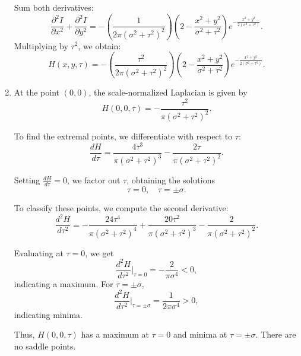 \documentclass[12pt]{article}
\begin{document}
\begin{enumerate}[label=\roman*., leftmargin=1cm]
Sum both derivatives:
\begin{equation}
    \frac{\partial^2 I}{\partial x^2} + \frac{\partial^2 I}{\partial y^2} = - \left(\frac{1}{2\pi (\sigma^2 + \tau^2)^2}\right) \left(2 - \frac{x^2 + y^2}{\sigma^2 + \tau^2} \right) e^{-\frac{x^2 + y^2}{2(\sigma^2 + \tau^2)}}.
\end{equation}
Multiplying by \( \tau^2 \), we obtain:
\begin{equation}
    H(x,y,\tau) = - \left( \frac{\tau^2}{2\pi (\sigma^2 + \tau^2)^2} \right) \left(2 - \frac{x^2 + y^2}{\sigma^2 + \tau^2} \right) e^{-\frac{x^2 + y^2}{2(\sigma^2 + \tau^2)}}.
\end{equation}
    \item
    At the point \( (0,0) \), the scale-normalized Laplacian is given by
\begin{equation}
    H(0,0,\tau) = -\frac{\tau^2}{\pi (\sigma^2 + \tau^2)^2}.
\end{equation}

To find the extremal points, we differentiate with respect to \( \tau \):
\begin{equation}
    \frac{dH}{d\tau} = \frac{4\tau^3}{\pi (\sigma^2 + \tau^2)^3} - \frac{2\tau}{\pi (\sigma^2 + \tau^2)^2}.
\end{equation}

Setting \( \frac{dH}{d\tau} = 0 \), we factor out \( \tau \), obtaining the solutions
\begin{equation}
    \tau = 0, \quad \tau = \pm\sigma.
\end{equation}

To classify these points, we compute the second derivative:
\begin{equation}
    \frac{d^2H}{d\tau^2} = -\frac{24\tau^4}{\pi (\sigma^2 + \tau^2)^4} + \frac{20\tau^2}{\pi (\sigma^2 + \tau^2)^3} - \frac{2}{\pi (\sigma^2 + \tau^2)^2}.
\end{equation}

Evaluating at \( \tau = 0 \), we get
\begin{equation}
    \frac{d^2H}{d\tau^2} \Big|_{\tau=0} = -\frac{2}{\pi \sigma^4} < 0,
\end{equation}
indicating a maximum. For \( \tau = \pm\sigma \),
\begin{equation}
    \frac{d^2H}{d\tau^2} \Big|_{\tau = \pm \sigma} = \frac{1}{2\pi \sigma^4} > 0,
\end{equation}
indicating minima.

Thus, \( H(0,0,\tau) \) has a maximum at \( \tau = 0 \) and minima at \( \tau = \pm\sigma \). There are no saddle points.


\end{enumerate}
\end{document}
